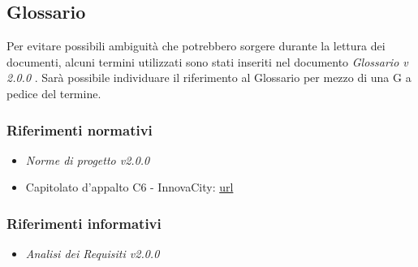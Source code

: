 \subsection{Glossario}
Per evitare possibili ambiguità che potrebbero sorgere durante la lettura dei documenti,
alcuni termini utilizzati sono stati inseriti nel documento \textit{Glossario v 2.0.0 }.
Sarà possibile individuare il riferimento al Glossario per mezzo
di una G a pedice del termine.
\subsubsection{Riferimenti normativi}
\begin{itemize}
    \item \textit{Norme di progetto v2.0.0}
    \item Capitolato d'appalto C6 - InnovaCity: \href{url}{url}
\end{itemize}

\subsubsection{Riferimenti informativi}
\begin{itemize}
    \item \textit{Analisi dei Requisiti v2.0.0}
\end{itemize}
